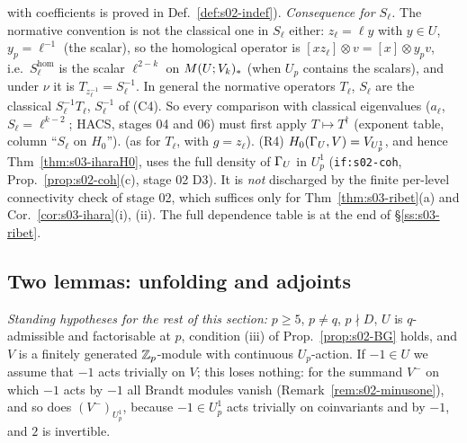 with coefficients is proved in Def.~\ref{def:s02-indef}).
\emph{Consequence for $S_\ell$.} The normative convention is not the classical one in $S_\ell$ either: $z_\ell=\ell y$ with $y\in U$, $y_p=\ell^{-1}$ (the
scalar), so the homological operator is $[xz_\ell]\otimes v=[x]\otimes y_pv$, i.e.\ $S_\ell^{\mathrm{hom}}$ is the scalar $\ell^{2-k}$ on
$M(U;V_k)_*$ (when $U_p$ contains the scalars), and under $\nu$ it is $T_{z_\ell^{-1}}=S_\ell^{-1}$. In general the normative operators $T_\ell$,
$S_\ell$ are the classical $S_\ell^{-1}T_\ell$, $S_\ell^{-1}$ of (C4). So every comparison with classical eigenvalues ($a_\ell$, $S_\ell=\ell^{k-2}$; HACS,
stages 04 and 06) must first apply $T\mapsto T^\dagger$ (exponent table, column ``$S_\ell$ on $H_0$''). \stproved{} (as for $T_\ell$, with $g=z_\ell$).
(R4) $H_0(\Gamma_U,V)=V_{U^1_p}$, and hence Thm~\ref{thm:s03-iharaH0}, uses the full density of $\Gamma_U$ in $U^1_p$ (\texttt{if:s02-coh},
Prop.~\ref{prop:s02-coh}(c), stage 02 D3). It is \emph{not} discharged by the finite per-level connectivity check of stage 02, which suffices only for
Thm~\ref{thm:s03-ribet}(a) and Cor.~\ref{cor:s03-ihara}(i), (ii). The full dependence table is at the end of \S\ref{ss:s03-ribet}.

\subsection{Two lemmas: unfolding and adjoints}
\emph{Standing hypotheses for the rest of this section:} $p\ge5$, $p\ne q$, $p\nmid D$, $U$ is $q$-admissible and factorisable at $p$, condition (iii) of
Prop.~\ref{prop:s02-BG} holds, and $V$ is a finitely generated $\mathbb{Z}_p$-module with continuous $U_p$-action. If $-1\in U$ we assume that $-1$ acts
trivially on $V$; this loses nothing: for the summand $V^-$ on which $-1$ acts by $-1$ all Brandt modules vanish (Remark~\ref{rem:s02-minusone}),
and so does $(V^-)_{U^1_p}$, because $-1\in U^1_p$ acts trivially on coinvariants and by $-1$, and $2$ is invertible.

